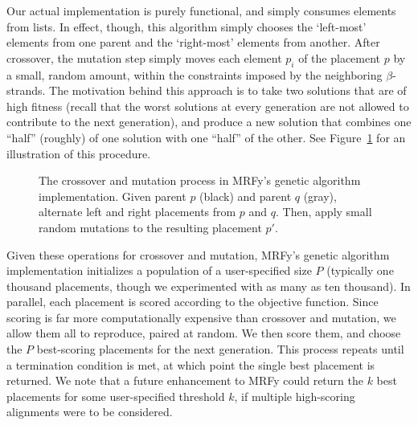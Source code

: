 \documentclass{acm_proc_article-sp}
\begin{document}
Our actual implementation is purely functional, and simply consumes elements 
from lists.
In effect, though, this algorithm simply chooses the `left-most' elements from 
one parent and the `right-most' elements from another.
After crossover, the mutation step simply moves each element $p_{i}$ of the
placement $p$ by a small, random amount, within the constraints imposed by the
neighboring $\beta$-strands.
The motivation behind this approach is to take two solutions that are of high
fitness (recall that the worst solutions at every generation are not allowed
to contribute to the next generation), and produce a new solution that combines
one ``half'' (roughly) of one solution with one ``half'' of the other.
See Figure~\ref{crossover} for an illustration of this procedure.

\begin{figure}[htb!]
\begin{center}
   \caption{The crossover and mutation process in MRFy's genetic algorithm 
   implementation.
   Given parent $p$ (black) and parent $q$ (gray), alternate left and right
    placements from $p$ and $q$.
    Then, apply small random mutations to the resulting placement $p'$.}
   \label{crossover}
 \end{center}
\end{figure}


Given these operations for crossover and mutation, MRFy's genetic algorithm
implementation initializes a population of a user-specified size $P$ (typically 
one thousand placements, though we experimented with as many as ten thousand).
In parallel, each placement is scored according to the objective function.
Since scoring is far more computationally expensive than crossover and mutation,
we allow them all to reproduce, paired at random.
We then score them, and choose the $P$ best-scoring placements for the next
generation.
This process repeats until a termination condition is met, at which point the
single best placement is returned.
We note that a future enhancement to MRFy could return the $k$ best placements
for some user-specified threshold $k$, if multiple high-scoring alignments were
to be considered.
\end{document}

